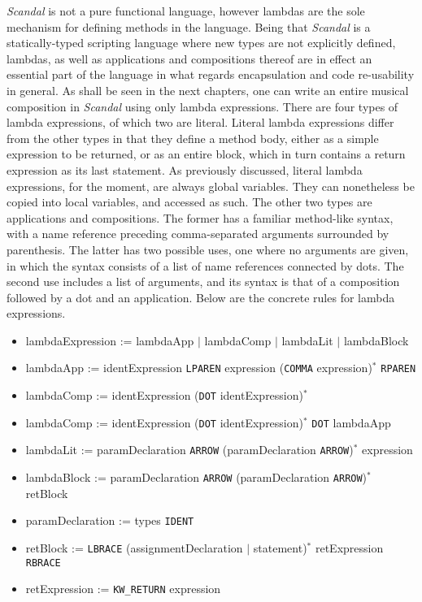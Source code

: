 \emph{Scandal} is not a pure functional language, however lambdas are the sole mechanism for defining methods in the language. Being that \emph{Scandal} is a statically-typed scripting language where new types are not explicitly defined, lambdas, as well as applications and compositions thereof are in effect an essential part of the language in what regards encapsulation and code re-usability in general. As shall be seen in the next chapters, one can write an entire musical composition in \emph{Scandal} using only lambda expressions. There are four types of lambda expressions, of which two are literal. Literal lambda expressions differ from the other types in that they define a method body, either as a simple expression to be returned, or as an entire block, which in turn contains a return expression as its last statement. As previously discussed, literal lambda expressions, for the moment, are always global variables. They can nonetheless be copied into local variables, and accessed as such. The other two types are applications and compositions. The former has a familiar method-like syntax, with a name reference preceding comma-separated arguments surrounded by parenthesis. The latter has two possible uses, one where no arguments are given, in which the syntax consists of a list of name references connected by dots. The second use includes a list of arguments, and its syntax is that of a composition followed by a dot and an application. Below are the concrete rules for lambda expressions.

\begin{itemize}
	\item lambdaExpression := lambdaApp $|$ lambdaComp $|$ lambdaLit $|$ lambdaBlock
	\item lambdaApp := identExpression \texttt{LPAREN} expression (\texttt{COMMA} expression)$^*$ \texttt{RPAREN}
	\item lambdaComp := identExpression (\texttt{DOT} identExpression)$^*$
	\item lambdaComp := identExpression (\texttt{DOT} identExpression)$^*$ \texttt{DOT} lambdaApp
	\item lambdaLit := paramDeclaration \texttt{ARROW} (paramDeclaration \texttt{ARROW})$^*$ expression
	\item lambdaBlock := paramDeclaration \texttt{ARROW} (paramDeclaration \texttt{ARROW})$^*$ retBlock
	\item paramDeclaration := types \texttt{IDENT}
	\item retBlock := \texttt{LBRACE} (assignmentDeclaration $|$ statement)$^*$ retExpression \texttt{RBRACE}
	\item retExpression := \texttt{KW\_RETURN} expression
\end{itemize}